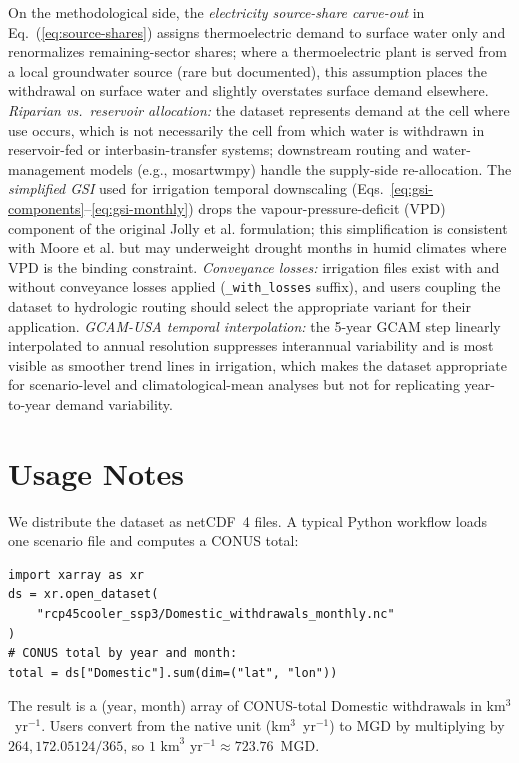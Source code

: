 \documentclass[fleqn,10pt]{wlscirep}
\begin{document}
On the methodological side, the \emph{electricity source-share carve-out} in Eq.~(\ref{eq:source-shares}) assigns thermoelectric demand to surface water only and renormalizes remaining-sector shares; where a thermoelectric plant is served from a local groundwater source (rare but documented), this assumption places the withdrawal on surface water and slightly overstates surface demand elsewhere. \emph{Riparian vs.\ reservoir allocation:} the dataset represents demand at the cell where use occurs, which is not necessarily the cell from which water is withdrawn in reservoir-fed or interbasin-transfer systems; downstream routing and water-management models (e.g., mosartwmpy) handle the supply-side re-allocation. The \emph{simplified GSI} used for irrigation temporal downscaling (Eqs.~\ref{eq:gsi-components}--\ref{eq:gsi-monthly}) drops the vapour-pressure-deficit (VPD) component of the original Jolly et al.\cite{Jolly_2005} formulation; this simplification is consistent with Moore et al.\cite{Moore_2015} but may underweight drought months in humid climates where VPD is the binding constraint. \emph{Conveyance losses:} irrigation files exist with and without conveyance losses applied (\texttt{\_with\_losses} suffix), and users coupling the dataset to hydrologic routing should select the appropriate variant for their application. \emph{GCAM-USA temporal interpolation:} the 5-year GCAM step linearly interpolated to annual resolution suppresses interannual variability and is most visible as smoother trend lines in irrigation, which makes the dataset appropriate for scenario-level and climatological-mean analyses but not for replicating year-to-year demand variability.

\section*{Usage Notes}

We distribute the dataset as netCDF~4 files. A typical Python workflow loads one scenario file and computes a CONUS total:
\begin{verbatim}
import xarray as xr
ds = xr.open_dataset(
    "rcp45cooler_ssp3/Domestic_withdrawals_monthly.nc"
)
# CONUS total by year and month:
total = ds["Domestic"].sum(dim=("lat", "lon"))
\end{verbatim}
The result is a (year, month) array of CONUS-total Domestic withdrawals in km$^3$~yr$^{-1}$. Users convert from the native unit (km$^3$~yr$^{-1}$) to MGD by multiplying by $264{,}172.05124/365$, so $1\text{ km}^3\text{ yr}^{-1} \approx 723.76$~MGD.
\end{document}
